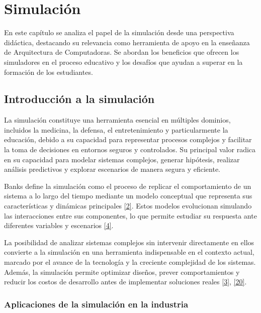 \documentclass[12pt,oneside]{templates/unerthesis}
\begin{document}
\hypertarget{simulacion}{%
\chapter{Simulación}\label{simulacion}}

En este capítulo se analiza el papel de la simulación desde una perspectiva didáctica, destacando su relevancia como herramienta de apoyo en la enseñanza de Arquitectura de Computadoras. Se abordan los beneficios que ofrecen los simuladores en el proceso educativo y los desafíos que ayudan a superar en la formación de los estudiantes.

\hypertarget{introducciuxf3n-a-la-simulaciuxf3n}{%
\section{Introducción a la simulación}\label{introducciuxf3n-a-la-simulaciuxf3n}}

La simulación constituye una herramienta esencial en múltiples dominios, incluidos la medicina, la defensa, el entretenimiento y particularmente la educación, debido a su capacidad para representar procesos complejos y facilitar la toma de decisiones en entornos seguros y controlados. Su principal valor radica en su capacidad para modelar sistemas complejos, generar hipótesis, realizar análisis predictivos y explorar escenarios de manera segura y eficiente.

Banks define la simulación como el proceso de replicar el comportamiento de un sistema a lo largo del tiempo mediante un modelo conceptual que representa sus características y dinámicas principales \protect\hyperlink{ref-banks_discrete-event_2010}{{[}2{]}}. Estos modelos evolucionan simulando las interacciones entre sus componentes, lo que permite estudiar su respuesta ante diferentes variables y escenarios \protect\hyperlink{ref-robinson_simulation_2014}{{[}4{]}}.

La posibilidad de analizar sistemas complejos sin intervenir directamente en ellos convierte a la simulación en una herramienta indispensable en el contexto actual, marcado por el avance de la tecnología y la creciente complejidad de los sistemas. Además, la simulación permite optimizar diseños, prever comportamientos y reducir los costos de desarrollo antes de implementar soluciones reales \protect\hyperlink{ref-law_simulation_2015}{{[}3{]}}, \protect\hyperlink{ref-zeigler_theory_2000}{{[}20{]}}.

\hypertarget{aplicaciones-de-la-simulaciuxf3n-en-la-industria}{%
\subsection{Aplicaciones de la simulación en la industria}\label{aplicaciones-de-la-simulaciuxf3n-en-la-industria}}
\end{document}
